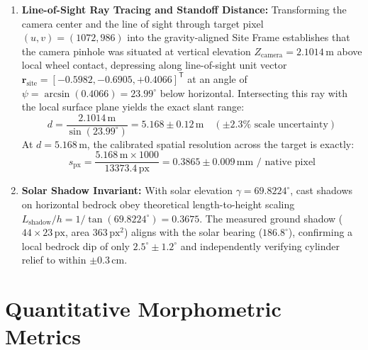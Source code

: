 \documentclass[11pt,a4paper]{article}
\begin{document}
\begin{enumerate}
\begin{equation}
\begin{aligned}
            \mathbf{V} &= [102.6375, -6412.962, 11743.22]^{\mathsf{T}}\,\text{px} \\
            \mathbf{R} &= [-1.060 \times 10^{-4}, 1.436779, -0.685884]^{\mathsf{T}}
        \end{aligned}
    \end{equation}
    Evaluating the intrinsic optical invariants yields effective focal length $f_{\text{px}} = 13373.4\,\text{px}$ ($f_{\text{eff}} = 98.96\,\text{mm}$), instantaneous field of view $\text{IFOV} = 74.78\,\mu\text{rad/px}$, and principal optical center $(h_c, v_c) = (699.43, 518.29)\,\text{px}$.
    \item \textbf{Line-of-Sight Ray Tracing and Standoff Distance:} Transforming the camera center and the line of sight through target pixel $(u, v) = (1072, 986)$ into the gravity-aligned Site Frame establishes that the camera pinhole was situated at vertical elevation $Z_{\text{camera}} = 2.1014\,\text{m}$ above local wheel contact, depressing along line-of-sight unit vector $\mathbf{r}_{\text{site}} = [-0.5982, -0.6905, +0.4066]^{\mathsf{T}}$ at an angle of $\psi = \arcsin(0.4066) = 23.99^\circ$ below horizontal. Intersecting this ray with the local surface plane yields the exact slant range:
    \begin{equation}
        d = \frac{2.1014\,\text{m}}{\sin(23.99^\circ)} = 5.168 \pm 0.12\,\text{m} \quad (\pm 2.3\% \text{ scale uncertainty})
    \end{equation}
    At $d = 5.168\,\text{m}$, the calibrated spatial resolution across the target is exactly:
    \begin{equation}
        s_{\text{px}} = \frac{5.168\,\text{m} \times 1000}{13373.4\,\text{px}} = 0.3865 \pm 0.009\,\text{mm / native pixel}
    \end{equation}
    \item \textbf{Solar Shadow Invariant:} With solar elevation $\gamma = 69.8224^\circ$, cast shadows on horizontal bedrock obey theoretical length-to-height scaling $L_{\text{shadow}} / h = 1/\tan(69.8224^\circ) = 0.3675$. The measured ground shadow ($44 \times 23\,\text{px}$, area $363\,\text{px}^2$) aligns with the solar bearing ($186.8^\circ$), confirming a local bedrock dip of only $2.5^\circ \pm 1.2^\circ$ and independently verifying cylinder relief to within $\pm 0.3\,\text{cm}$.
\end{enumerate}

\section{Quantitative Morphometric Metrics}
\end{document}

